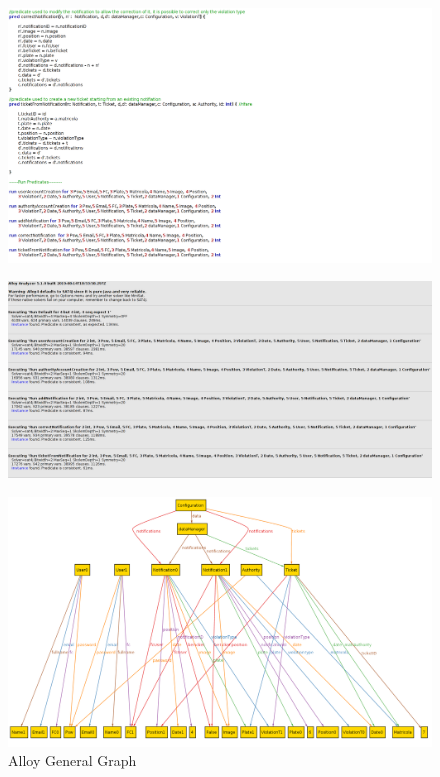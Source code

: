 \documentclass {article}
\begin{document}
		\begin{figure}[H]
			\centering
			\includegraphics[scale=0.50]{Images/Alloy/Pred2.png}
		\end{figure}
		\begin{figure}[H]
			\centering
			\includegraphics[scale=0.25]{Images/Alloy/AlloyExecuting.png}
		\end{figure}
		\begin{figure}[H]
			\centering
			\includegraphics[scale=0.30]{Images/Alloy/AlloyDiagram.png}
			\caption{Alloy General Graph}
		\end{figure}
	
\end{document}
